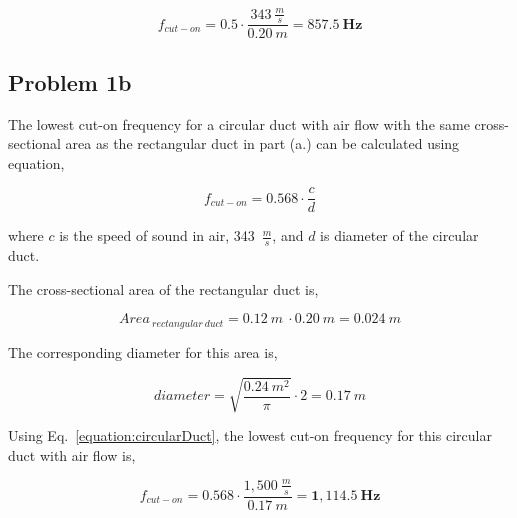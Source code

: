 \vspace{-0.25cm}
\begin{equation*}
    f_{cut-on} = 0.5 \cdot \frac{ 343~\frac{m}{s} }{ 0.20~m } = \boldsymbol{857.5~Hz}
\end{equation*}




\subsection*{Problem 1b}

The lowest cut-on frequency for a circular duct with air flow with the same cross-sectional area as the rectangular duct in part (a.) can be calculated using equation,

\vspace{-0.25cm}
\begin{equation}
    f_{cut-on} = 0.568 \cdot \frac{c}{d}
    \label{equation:circularDuct}
\end{equation}

where $c$ is the speed of sound in air, 343~$\frac{m}{s}$,  and $d$ is diameter of the circular duct.

\vspace{0.25cm}
The cross-sectional area of the rectangular duct is,

\vspace{-0.25cm}
\begin{equation*}
    Area_{~rectangular~duct} = 0.12~m~\cdot0.20~m =  0.024~m
\end{equation*}

\vspace{0.25cm}
The corresponding diameter for this area is,

\vspace{-0.25cm}
\begin{equation*}
    diameter = \sqrt{ \frac{0.24~m^2}{\pi} } \cdot 2 = 0.17~m
\end{equation*}

\vspace{0.25cm}
Using Eq.~\ref{equation:circularDuct}, the lowest cut-on frequency for this circular duct with air flow is,

\vspace{-0.25cm}
\begin{equation*}
    f_{cut-on} = 0.568 \cdot \frac{ 1,500~\frac{m}{s} }{ 0.17~m } = \boldsymbol{1,114.5~Hz}
\end{equation*}





